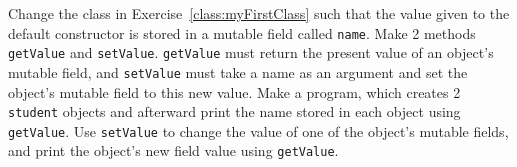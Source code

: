 Change the class in Exercise~\ref{class:myFirstClass} such that the value given to the default constructor is stored in a mutable field called \lstinline{name}. Make 2 methods \lstinline{getValue} and \lstinline{setValue}. \lstinline{getValue} must return the present value of an object's mutable field, and \lstinline{setValue} must take a name as an argument and set the object's mutable field to this new value. Make a program, which creates 2 \lstinline{student} objects and afterward print the name stored in each object using \lstinline{getValue}. Use \lstinline{setValue} to change the value of one of the object's mutable fields, and print the object's new field value using \lstinline{getValue}.